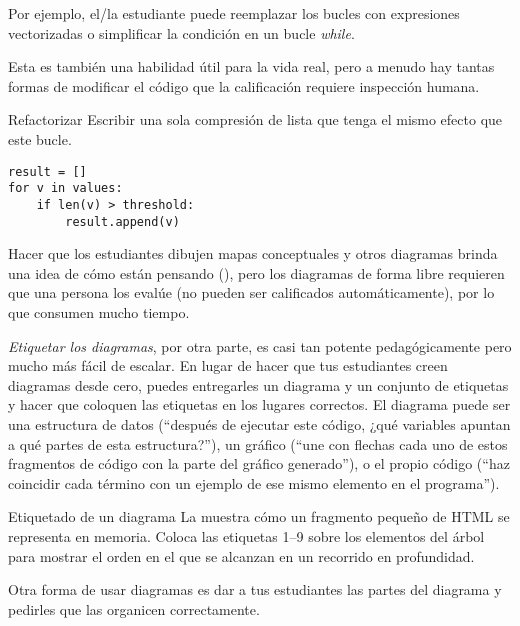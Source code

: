 Por ejemplo, 
el/la estudiante puede reemplazar los bucles con expresiones vectorizadas
 o simplificar la condición en un bucle \emph{while}.

Esta es también una habilidad útil para la vida real, 
pero a menudo hay tantas formas de modificar el código
que la calificación requiere inspección humana.

\begin{aside}{Refactorizar}
  Escribir una sola compresión de lista que tenga el mismo efecto que este bucle.

\begin{verbatim}
result = []
for v in values:
    if len(v) > threshold:
        result.append(v)
\end{verbatim}
\end{aside}



Hacer que los estudiantes dibujen mapas conceptuales y otros diagramas brinda una idea de cómo están pensando (),
pero los diagramas de forma libre requieren que una persona los evalúe (no pueden ser calificados automáticamente), por lo que consumen mucho tiempo.

\emph{Etiquetar los diagramas},
por otra parte, 
es casi tan potente pedagógicamente  
pero mucho más fácil de escalar.
En lugar de hacer que tus estudiantes creen diagramas desde cero, puedes entregarles un diagrama y un conjunto de etiquetas y hacer que coloquen las etiquetas en los lugares correctos.
El diagrama puede ser una estructura de datos (``después de ejecutar este código, ¿qué variables apuntan a qué partes de esta estructura?''), un gráfico (``une con flechas cada uno de estos fragmentos de código con la parte del gráfico generado''), o el propio código (``haz coincidir cada término con un ejemplo de ese mismo elemento en el programa'').

\begin{aside}{Etiquetado de un diagrama}
  La  muestra
cómo un fragmento pequeño de HTML se representa en memoria.
  Coloca las etiquetas 1--9 sobre los elementos del árbol 
  para mostrar el orden en el que se alcanzan en un recorrido en profundidad.
\end{aside}




Otra forma de usar diagramas es dar a tus estudiantes las partes del diagrama y pedirles que las organicen correctamente.

